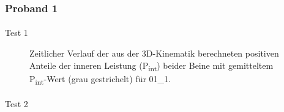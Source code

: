 \documentclass[
  letterpaper,
  DIV=11]{scrartcl}
\makeatletter
\let\oldparagraph\paragraph
\renewcommand{\paragraph}{
    \@ifstar
      \xxxParagraphStar
      \xxxParagraphNoStar
  }
\newcommand{\xxxParagraphStar}[1]{\oldparagraph*{#1}\mbox{}}
\newcommand{\xxxParagraphNoStar}[1]{\oldparagraph{#1}\mbox{}}
\makeatother
\begin{document}
\subsubsection{Proband 1}

\paragraph{Test 1}

\begin{figure}


\caption{\label{fig-PInt_Kinematik_01_1}Zeitlicher Verlauf der aus der
3D-Kinematik berechneten positiven Anteile der inneren Leistung
(P\textsubscript{int}) beider Beine mit gemitteltem
P\textsubscript{int}-Wert (grau gestrichelt) für 01\_1.}

\end{figure}%

\paragraph{Test 2}
\end{document}
